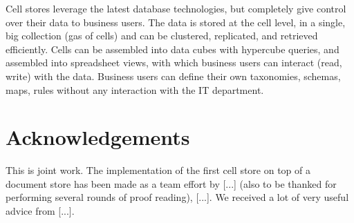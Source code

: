 \documentclass{acm_proc_article-sp}
\begin{document}
Cell stores leverage the latest database technologies, but completely give control over their data to business users. The data is stored at the cell level, in a single, big collection (gas of cells) and can be clustered, replicated, and retrieved efficiently. Cells can be assembled into data cubes with hypercube queries, and assembled into spreadsheet views, with which business users can interact (read, write) with the data. Business users can define their own taxonomies, schemas, maps, rules without any interaction with the IT department.

\section{Acknowledgements}

This is joint work. The implementation of the first cell store on top of a document store has been made as a team effort by [...] (also to be thanked for performing several rounds of proof reading), [...]. We received a lot of very useful advice from [...].



\end{document}
